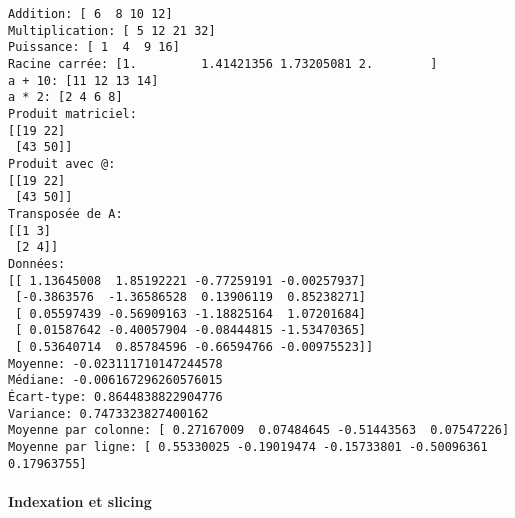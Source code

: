 \documentclass[11pt]{article}
\begin{document}
    \begin{Verbatim}[commandchars=\\\{\}]
Addition: [ 6  8 10 12]
Multiplication: [ 5 12 21 32]
Puissance: [ 1  4  9 16]
Racine carrée: [1.         1.41421356 1.73205081 2.        ]
a + 10: [11 12 13 14]
a * 2: [2 4 6 8]
Produit matriciel:
[[19 22]
 [43 50]]
Produit avec @:
[[19 22]
 [43 50]]
Transposée de A:
[[1 3]
 [2 4]]
Données:
[[ 1.13645008  1.85192221 -0.77259191 -0.00257937]
 [-0.3863576  -1.36586528  0.13906119  0.85238271]
 [ 0.05597439 -0.56909163 -1.18825164  1.07201684]
 [ 0.01587642 -0.40057904 -0.08444815 -1.53470365]
 [ 0.53640714  0.85784596 -0.66594766 -0.00975523]]
Moyenne: -0.023111710147244578
Médiane: -0.006167296260576015
Écart-type: 0.8644838822904776
Variance: 0.7473323827400162
Moyenne par colonne: [ 0.27167009  0.07484645 -0.51443563  0.07547226]
Moyenne par ligne: [ 0.55330025 -0.19019474 -0.15733801 -0.50096361  0.17963755]
    \end{Verbatim}

    \paragraph{Indexation et slicing}\label{indexation-et-slicing}
\end{document}
